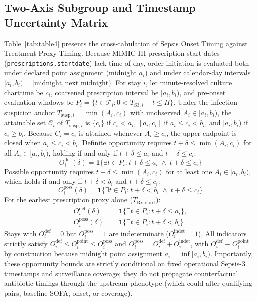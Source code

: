 \documentclass[12pt,a4paper]{article}
\begin{document}
\subsection{Two-Axis Subgroup and Timestamp Uncertainty Matrix}
Table~\ref{tab:table4} presents the cross-tabulation of Sepsis Onset Timing against Treatment Proxy Timing. Because MIMIC-III prescription start dates (\texttt{prescriptions.\allowbreak startdate}) lack time of day, order initiation is evaluated both under declared point assignment (midnight $a_i$) and under calendar-day intervals $[a_i, b_i) = [\text{midnight}, \text{next midnight})$. For stay $i$, let minute-resolved culture charttime be $c_i$, coarsened prescription interval be $[a_i, b_i)$, and pre-onset evaluation windows be $P_i = \{ t \in \mathcal{T}_i : 0 < T_{\mathrm{S3}, i} - t \le H \}$. Under the infection-suspicion anchor $T_{\mathrm{susp}, i} = \min(A_i, c_i)$ with unobserved $A_i \in [a_i, b_i)$, the attainable set $\mathcal{C}_i$ of $T_{\mathrm{susp}, i}$ is $\{c_i\}$ if $c_i < a_i$, $[a_i, c_i]$ if $a_i \le c_i < b_i$, and $[a_i, b_i)$ if $c_i \ge b_i$. Because $C_i = c_i$ is attained whenever $A_i \ge c_i$, the upper endpoint is closed when $a_i \le c_i < b_i$. Definite opportunity requires $t + \delta \le \min(A_i, c_i)$ for all $A_i \in [a_i, b_i)$, holding if and only if $t + \delta \le a_i$ and $t + \delta \le c_i$:
\begin{equation}
O_i^{\mathrm{def}}(\delta) = \mathbf{1} \bigl\{ \exists t \in P_i : t + \delta \le a_i \;\land\; t + \delta \le c_i \bigr\}
\end{equation}
Possible opportunity requires $t + \delta \le \min(A_i, c_i)$ for at least one $A_i \in [a_i, b_i)$, which holds if and only if $t + \delta < b_i$ and $t + \delta \le c_i$:
\begin{equation}
O_i^{\mathrm{poss}}(\delta) = \mathbf{1} \bigl\{ \exists t \in P_i : t + \delta < b_i \;\land\; t + \delta \le c_i \bigr\}
\end{equation}
For the earliest prescription proxy alone ($T_{\mathrm{Rx,start}}$):
\begin{equation}
\begin{aligned}
O_i^{\mathrm{def}}(\delta) &= \mathbf{1} \bigl\{ \exists t \in P_i : t + \delta \le a_i \bigr\}, \\
O_i^{\mathrm{poss}}(\delta) &= \mathbf{1} \bigl\{ \exists t \in P_i : t + \delta < b_i \bigr\}
\end{aligned}
\end{equation}
Stays with $O_i^{\mathrm{def}} = 0$ but $O_i^{\mathrm{poss}} = 1$ are indeterminate ($O_i^{\mathrm{indet}} = 1$). All indicators strictly satisfy $O_i^{\mathrm{def}} \le O_i^{\mathrm{point}} \le O_i^{\mathrm{poss}}$ and $O_i^{\mathrm{poss}} = O_i^{\mathrm{def}} + O_i^{\mathrm{indet}}$, with $O_i^{\mathrm{def}} \equiv O_i^{\mathrm{point}}$ by construction because midnight point assignment $a_i = \inf [a_i, b_i)$. Importantly, these opportunity bounds are strictly conditional on fixed operational Sepsis-3 timestamps and surveillance coverage; they do not propagate counterfactual antibiotic timings through the upstream phenotype (which could alter qualifying pairs, baseline SOFA, onset, or coverage).
\end{document}

